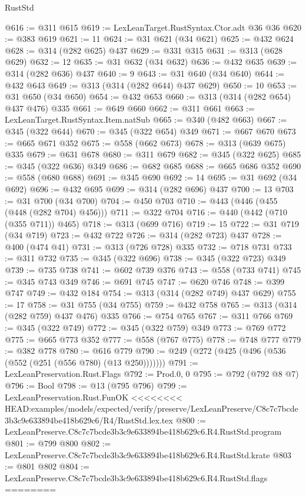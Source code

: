\begin{lexlean}{RustStd}
\begin{coremodule}
{\begin{coremodule}
{{{{{{{{{@616 := @311 @615
@619 := LexLeanTarget.RustSyntax.Ctor.adt @36 @36
@620 := @383 @619
@621 := 11
@624 := @31 @621 (@34 @621)
@625 := @432 @624
@628 := @314 (@282 @625) @437
@629 := @331 @315
@631 := @313 (@628 @629)
@632 := 12
@635 := @31 @632 (@34 @632)
@636 := @432 @635
@639 := @314 (@282 @636) @437
@640 := 9
@643 := @31 @640 (@34 @640)
@644 := @432 @643
@649 := @313 (@314 (@282 @644) @437 @629)
@650 := 10
@653 := @31 @650 (@34 @650)
@654 := @432 @653
@660 := @313 (@314 (@282 @654) @437 @476) @335
@661 := @649 @660
@662 := @311 @661
@663 := LexLeanTarget.RustSyntax.Item.natSub
@665 := @340 (@482 @663)
@667 := @345 (@322 @644)
@670 := @345 (@322 @654) @349
@671 := @667 @670
@673 := @665 @671 @352
@675 := @558 (@662 @673)
@678 := @313 (@639 @675) @335
@679 := @631 @678
@680 := @311 @679
@682 := @345 (@322 @625)
@685 := @345 (@322 @636) @349
@686 := @682 @685
@688 := @665 @686 @352
@690 := @558 (@680 @688)
@691 := @345 @690
@692 := 14
@695 := @31 @692 (@34 @692)
@696 := @432 @695
@699 := @314 (@282 @696) @437
@700 := 13
@703 := @31 @700 (@34 @700)
@704 := @450 @703
@710 := @443 (@446 (@455 (@448 (@282 @704) @456)))
@711 := @322 @704
@716 := @440 (@442 (@710 (@355 @711)) @465)
@718 := @313 (@699 @716)
@719 := 15
@722 := @31 @719 (@34 @719)
@723 := @432 @722
@726 := @314 (@282 @723) @437
@728 := @400 (@474 @41)
@731 := @313 (@726 @728) @335
@732 := @718 @731
@733 := @311 @732
@735 := @345 (@322 @696)
@738 := @345 (@322 @723) @349
@739 := @735 @738
@741 := @602 @739 @376
@743 := @558 (@733 @741)
@745 := @345 @743 @349
@746 := @691 @745
@747 := @620 @746
@748 := @399 @747
@749 := @432 @184
@754 := @313 (@314 (@282 @749) @437 @629)
@755 := 17
@758 := @31 @755 (@34 @755)
@759 := @432 @758
@765 := @313 (@314 (@282 @759) @437 @476) @335
@766 := @754 @765
@767 := @311 @766
@769 := @345 (@322 @749)
@772 := @345 (@322 @759) @349
@773 := @769 @772
@775 := @665 @773 @352
@777 := @558 (@767 @775)
@778 := @748 @777
@779 := @382 @778
@780 := @616 @779
@790 := @249 (@272 (@425 (@496 (@536 (@552 (@251 (@556 @780) (@13 @250)))))))
@791 := LexLeanPreservation.Rust.Flags
@792 := Prod.{0, 0}
@795 := @792 (@792 @8 @7)
@796 := Bool
@798 := @13 (@795 @796)
@799 := LexLeanPreservation.Rust.FunOK
<<<<<<<< HEAD:examples/models/expected/verify/preserve/LexLeanPreserve/C8c7c7bcde3b3c9e633894be418b629c6/R4/RustStd.lex.tex
@800 := LexLeanPreserve.C8c7c7bcde3b3c9e633894be418b629c6.R4.RustStd.program
@801 := @799 @800
@802 := LexLeanPreserve.C8c7c7bcde3b3c9e633894be418b629c6.R4.RustStd.krate
@803 := @801 @802
@804 := LexLeanPreserve.C8c7c7bcde3b3c9e633894be418b629c6.R4.RustStd.flags
========
}}}}}}}}}
\end{coremodule}}
\end{coremodule}
\end{lexlean}
